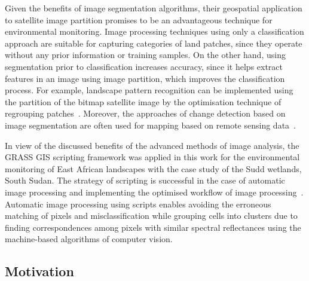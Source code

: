 \documentclass[analytics,article,accept,pdftex,moreauthors]{Definitions/mdpi}
\begin{document}
Given the benefits of image segmentation algorithms, their geospatial application to satellite image partition promises to be an advantageous technique for environmental monitoring. Image processing techniques using only a classification approach are suitable for capturing categories of land patches, since they operate without any prior information or training samples. On the other hand, using segmentation prior to classification increases accuracy, since it helps extract features in an image using image partition, which improves the classification process. For example, landscape pattern recognition can be implemented using the partition of the bitmap satellite image by the optimisation technique of regrouping  patches~\cite{Lietal2017}. %
Moreover, the approaches of change detection based on image segmentation are often used for mapping based on  remote sensing data~\cite{LeiNandi}. 

In view of the discussed benefits of the advanced methods of image analysis, the GRASS GIS scripting framework was applied in this work for the environmental monitoring of East African landscapes with the case study of the Sudd wetlands, South Sudan. The strategy of scripting is successful in the case of automatic image processing and  implementing the optimised workflow of image processing~\cite{Borcard,ijgi11090473}. Automatic image processing using scripts enables avoiding the erroneous matching of pixels and misclassification while grouping cells into clusters due to finding correspondences among pixels with similar spectral reflectances using the machine-based algorithms of computer vision. %

\subsection{Motivation} 
\end{document}
